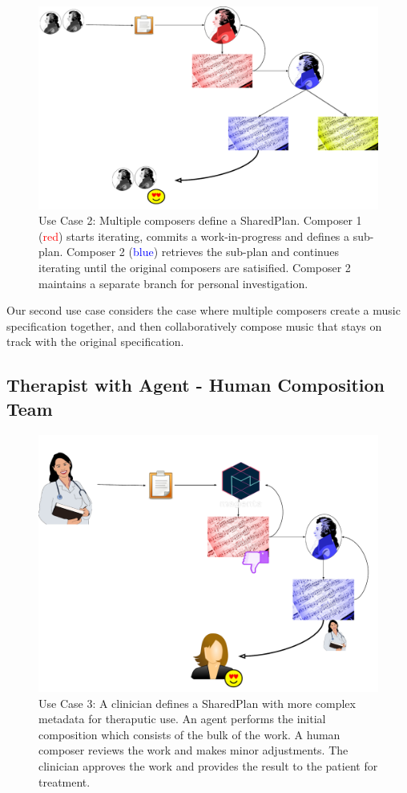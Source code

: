 \documentclass[final,authoryear,5p,times,twocolumn]{elsarticle}
\begin{document}
\begin{figure}
	\includegraphics[scale=0.35]{multicomposer.pdf}
	\caption{Use Case 2: Multiple composers define a SharedPlan. Composer 1 (\textcolor{red}{red}) starts
	iterating, commits a work-in-progress and defines a sub-plan. Composer 2 (\textcolor{blue}{blue}) retrieves the sub-plan and continues iterating until the original composers are
	satisified. Composer 2 maintains a separate branch for personal investigation.}
	\label{fig:multicomposer}
\end{figure}


Our second use case considers the case where multiple composers create a music specification together, and then collaboratively compose music that stays on track with the original specification.

\subsection{Therapist with Agent - Human Composition Team}

\begin{figure}
	\includegraphics[scale=0.35]{clinical.pdf}
	\caption{Use Case 3: A clinician defines a SharedPlan with more complex metadata for theraputic use. An agent performs the initial composition which consists of the bulk of the work.	A human composer reviews the work and makes minor adjustments. The clinician approves the work and provides the result to the patient for treatment.}
	\label{fig:clinical}
\end{figure}
\end{document}
